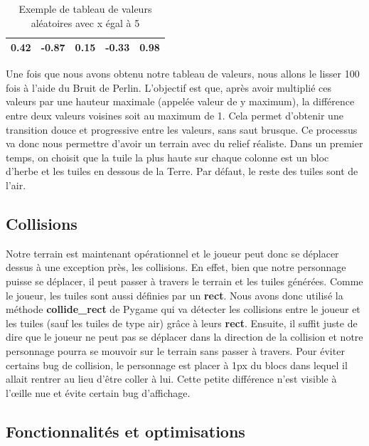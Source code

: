 \documentclass{article}
\begin{document}

\begin{table}[h]
  \centering
  \begin{tabular}{|c|c|c|c|c|}
    \hline
    0.42 & -0.87 & 0.15 & -0.33 & 0.98\\
    \hline
  \end{tabular}
  \caption{Exemple de tableau de valeurs aléatoires avec x égal à 5}
  \label{tableau_aleatoire}
\end{table}

Une fois que nous avons obtenu notre tableau de valeurs, nous allons le lisser 100 fois à l’aide du Bruit de Perlin. L’objectif est que, après avoir multiplié ces valeurs par une hauteur maximale (appelée valeur de y maximum), la différence entre deux valeurs voisines soit au maximum de 1. Cela permet d’obtenir une transition douce et progressive entre les valeurs, sans saut brusque. Ce processus va donc nous permettre d'avoir un terrain avec du relief réaliste. Dans un premier temps, on choisit que la tuile la plus haute sur chaque colonne est un bloc d'herbe et les tuiles en dessous de la Terre. Par défaut, le reste des tuiles sont de l'air.\par %

\subsection{Collisions}

Notre terrain est maintenant opérationnel et le joueur peut donc se déplacer dessus à une exception près, les collisions. En effet, bien que notre personnage puisse se déplacer, il peut passer à travers le terrain et les tuiles générées. Comme le joueur, les tuiles sont aussi définies par un \textbf{rect}. Nous avons donc utilisé la méthode \textbf{collide\_rect} de Pygame qui va détecter les collisions entre le joueur et les tuiles (sauf les tuiles de type air) grâce à leurs \textbf{rect}. Ensuite, il suffit juste de dire que le joueur ne peut pas se déplacer dans la direction de la collision et notre personnage pourra se mouvoir sur le terrain sans passer à travers. Pour éviter certains bug de collision, le personnage est placer à 1px du blocs dans lequel il allait rentrer au lieu d'être coller à lui. Cette petite différence n'est visible à l'œille nue et évite certain bug d'affichage. \par

\subsection{Fonctionnalités et optimisations}
\end{document}
